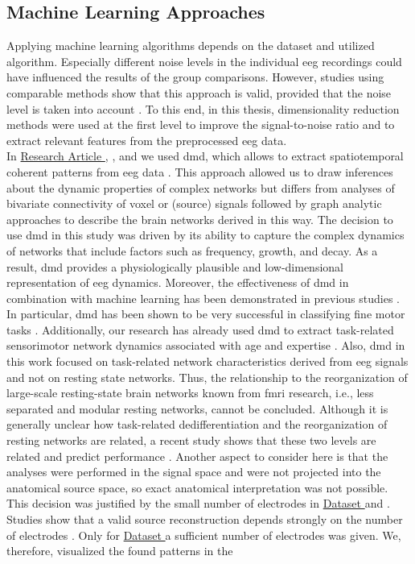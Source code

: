 \subsection{Machine Learning Approaches}
Applying machine learning algorithms depends on the dataset and utilized algorithm. Especially different noise levels in the individual \gls{eeg} recordings could have influenced the results of the group comparisons. However, studies using comparable methods show that this approach is valid, provided that the noise level is taken into account \cite{Bae2020, Vahid2020}. To this end, in this thesis, dimensionality reduction methods were used at the first level to improve the signal-to-noise ratio and to extract relevant features from the preprocessed \gls{eeg} data. \\
In \hyperref[results:paperI]{Research Article }, \hyperref[results:paperIII]{}, and \hyperref[results:paperIV]{} we used \gls{dmd}, which allows to extract spatiotemporal coherent patterns from \gls{eeg} data \cite{Brunton2016}. This approach allowed us to draw inferences about the dynamic properties of complex networks but differs from analyses of bivariate connectivity of voxel or (source) signals followed by graph analytic approaches to describe the brain networks derived in this way. The decision to use \gls{dmd} in this study was driven by its ability to capture the complex dynamics of networks that include factors such as frequency, growth, and decay. As a result, \gls{dmd} provides a physiologically plausible and low-dimensional representation of \gls{eeg} dynamics. Moreover, the effectiveness of \gls{dmd} in combination with machine learning has been demonstrated in previous studies \cite{Brunton2016, Kunert-Graf2019, Shiraishi2020}. In particular, \gls{dmd} has been shown to be very successful in classifying fine motor tasks \cite{Shiraishi2020}. Additionally, our research has already used \gls{dmd} to extract task-related sensorimotor network dynamics associated with age and expertise \cite{Vieluf2018, Goelz2018}. Also, \gls{dmd} in this work focused on task-related network characteristics derived from \gls{eeg} signals and not on resting state networks. Thus, the relationship to the reorganization of large-scale resting-state brain networks known from \gls{fmri} research, i.e., less separated and modular resting networks, cannot be concluded. Although it is generally unclear how task-related dedifferentiation and the reorganization of resting networks are related, a recent study shows that these two levels are related and predict performance \cite{Cassedy2020netw_distinct}. Another aspect to consider here is that the analyses were performed in the signal space and were not projected into the anatomical source space, so exact anatomical interpretation was not possible. This decision was justified by the small number of electrodes in \hyperref[methods:datasets:I]{Dataset } and \hyperref[methods:datasets:II]{}. Studies show that a valid source reconstruction depends strongly on the number of electrodes \cite{Song2015, Lantz2003}. Only for \hyperref[methods:datasets:III]{Dataset } a sufficient number of electrodes was given. We, therefore, visualized the found patterns in the 